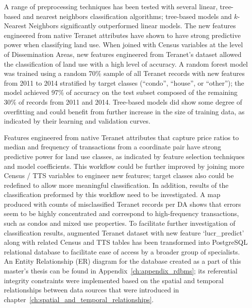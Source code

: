 A range of preprocessing techniques has been tested with several linear, tree-based and nearest neighbors classification algorithms;
tree-based models and $k$-Nearest Neighbors significantly outperformed linear models.
The new features engineered from native Teranet attributes have shown to have strong predictive power when classifying land use.
When joined with Census variables at the level of Dissemination Areas, new features engineered from Teranet's dataset allowed the classification of land use with a high level of accuracy.
A random forest model was trained using a random 70\% sample of all Teranet records with new features from 2011 to 2014 stratified by target classes (``condo'', ``house'', or ``other'');
the model achieved 97\% of accuracy on the test subset composed of the remaining 30\% of records from 2011 and 2014.
Tree-based models did show some degree of overfitting and could benefit from further increase in the size of training data, as indicated by their learning and validation curves.

Features engineered from native Teranet attributes that capture price ratios to median and frequency of transactions from a coordinate pair have strong predictive power for land use classes, as indicated by feature selection techniques and model coefficients.
This workflow could be further improved by joining more Census / TTS variables to engineer new features;
target classes also could be redefined to allow more meaningful classification.
In addition, results of the classification preformed by this workflow need to be investigated.
A map produced with counts of misclassified Teranet records per DA shows that errors seem to be highly concentrated and correspond to high-frequency transactions, such as condos and mixed use properties.
To facilitate further investigation of classification results, augmented Teranet dataset with new feature `lucr\_predict' along with related Census and TTS tables has been transformed into PostgreSQL relational database to facilitate ease of access by a broader group of specialists.
An Entity Relationship (ER) diagram for the database created as a part of this master's thesis can be found in Appendix~\ref{ch:appendix_rdbms};
its referential integrity constraints were implemented based on the spatial and temporal relationships between data sources that were introduced in chapter~\ref{ch:spatial_and_temporal_relationships}.
